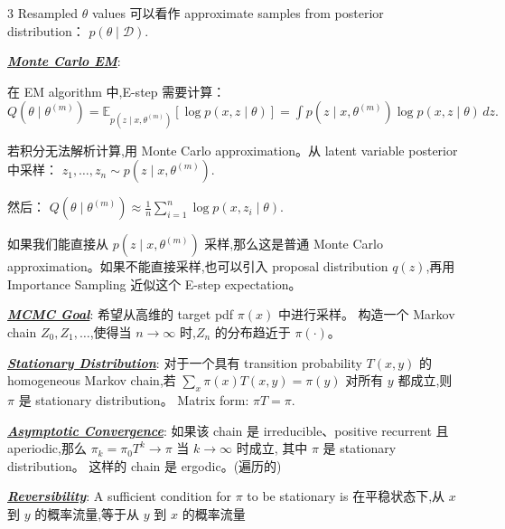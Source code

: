 \documentclass[12pt]{article}
\newcommand{\bulletPoint}[1]{\underline{\textit{\textbf{#1}}}}
\begin{document}
\begin{multicols*}{3}
Resampled $\theta$ values 可以看作 approximate samples from posterior distribution：
$
p(\theta\mid \mathcal D).
$


\bulletPoint{Monte Carlo EM}:

在 EM algorithm 中,E-step 需要计算：
$
Q(\theta\mid \theta^{(m)})
=
\mathbb E_{p(z\mid x,\theta^{(m)})}
\left[
\log p(x,z\mid \theta)
\right]
=
\int
p(z\mid x,\theta^{(m)})
\log p(x,z\mid \theta)
\,dz.
$

若积分无法解析计算,用 Monte Carlo approximation。从 latent variable posterior 中采样：
$
z_1,\dots,z_n
\sim
p(z\mid x,\theta^{(m)}).
$

然后：
$
Q(\theta\mid \theta^{(m)})
\approx
\frac{1}{n}
\sum_{i=1}^n
\log p(x,z_i\mid \theta).
$

如果我们能直接从
$
p(z\mid x,\theta^{(m)})
$
采样,那么这是普通 Monte Carlo approximation。如果不能直接采样,也可以引入 proposal distribution $q(z)$,再用 Importance Sampling 近似这个 E-step expectation。





\bulletPoint{MCMC Goal}:
希望从高维的 target pdf $\pi(x)$ 中进行采样。
构造一个 Markov chain $Z_0,Z_1,\dots$,使得当 $n\to\infty$ 时,$Z_n$ 的分布趋近于 $\pi(\cdot)$。

\bulletPoint{Stationary Distribution}:
对于一个具有 transition probability $T(x,y)$ 的 homogeneous Markov chain,若
$\sum_x \pi(x)T(x,y)=\pi(y)$ 对所有 $y$ 都成立,则 $\pi$ 是 stationary distribution。
Matrix form:
$\pi T=\pi.$


\bulletPoint{Asymptotic Convergence}:
如果该 chain 是 irreducible、positive recurrent 且 aperiodic,那么
$\pi_k=\pi_0T^k \to \pi$
当 $k\to\infty$ 时成立,
其中 $\pi$ 是 stationary distribution。
这样的 chain 是 ergodic。(遍历的)

\bulletPoint{Reversibility}:
A sufficient condition for $\pi$ to be stationary is
\scalebox{0.7}{\textcolor{blue!50!black}{$\textstyle
\pi(x)T(x,y)=\pi(y)T(y,x)
 \forall x,y.
$}}
在平稳状态下,从 $x$ 到 $y$ 的概率流量,等于从 $y$ 到 $x$ 的概率流量


\end{multicols*}
\end{document}
